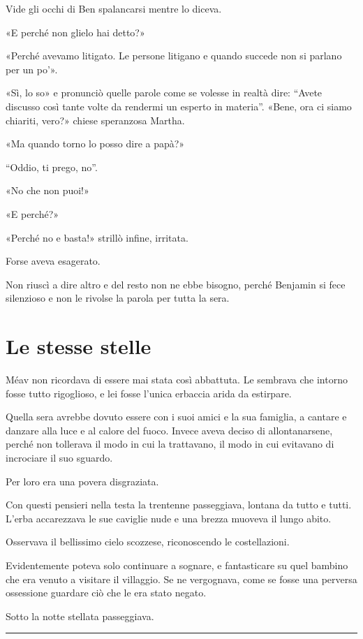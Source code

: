 \documentclass[a4paper,10pt]{memoir}
\begin{document}
Vide gli occhi di Ben spalancarsi mentre lo diceva.

«E perché non glielo hai detto?»

«Perché avevamo litigato. Le persone litigano e quando succede non si parlano per un po'».

«Sì, lo so» e pronunciò quelle parole come se volesse in realtà dire: ``Avete discusso così tante volte da rendermi un
esperto in materia''. «Bene, ora ci siamo chiariti, vero?» chiese speranzosa Martha.

«Ma quando torno lo posso dire a papà?»

``Oddio, ti prego, no''.

«No che non puoi!»

«E perché?»

«Perché no e basta!» strillò infine, irritata.

Forse aveva esagerato.

Non riuscì a dire altro e del resto non ne ebbe bisogno, perché Benjamin si fece silenzioso e non le rivolse la parola
per tutta la sera.

\chapter{Le stesse stelle}

Méav non ricordava di essere mai stata così abbattuta. Le sembrava che intorno fosse tutto rigoglioso, e lei fosse
l'unica erbaccia arida da estirpare.

Quella sera avrebbe dovuto essere con i suoi amici e la sua famiglia, a cantare e danzare alla luce e al calore del
fuoco. Invece aveva deciso di allontanarsene, perché non tollerava il modo in cui la trattavano, il modo in cui
evitavano di incrociare il suo sguardo.

Per loro era una povera disgraziata.

Con questi pensieri nella testa la trentenne passeggiava, lontana da tutto e tutti. L'erba accarezzava le sue caviglie
nude e una brezza muoveva il lungo abito.

Osservava il bellissimo cielo scozzese, riconoscendo le costellazioni.

Evidentemente poteva solo continuare a sognare, e fantasticare su quel bambino che era venuto a visitare il villaggio.
Se ne vergognava, come se fosse una perversa ossessione guardare ciò che le era stato negato.

Sotto la notte stellata passeggiava.

\plainbreak{1}
\end{document}
